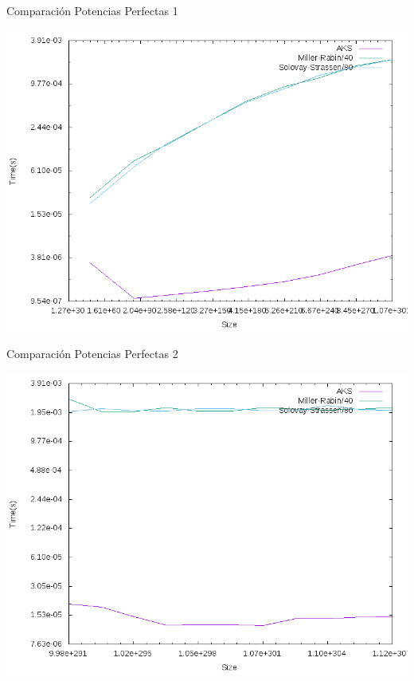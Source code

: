 \documentclass{beamer}
\begin{document}
\begin{frame}{Comparación Potencias Perfectas 1}
	\begin{alertblock}{}
		\begin{center}
			\includegraphics[scale=0.40]{../Memoria/img/graphs/aks-probs-powers-100-mean}
		\end{center}
	\end{alertblock}
\end{frame}

\begin{frame}{Comparación Potencias Perfectas 2}
	\begin{alertblock}{}
		\begin{center}
			\includegraphics[scale=0.40]{../Memoria/img/graphs/aks-probs-powers-5-mean}
		\end{center}
	\end{alertblock}
\end{frame}
\end{document}
